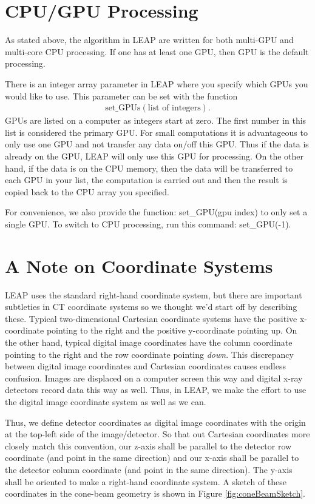 \documentclass[11pt]{article}
\begin{document}
\section{CPU/GPU Processing}

As stated above, the algorithm in LEAP are written for both multi-GPU and multi-core CPU processing.  If one has at least one GPU, then GPU is the default processing.

There is an integer array parameter in LEAP where you specify which GPUs you would like to use.  This parameter can be set with the function
\begin{eqnarray*}
    \text{set\_GPUs}(\text{list of integers}).
\end{eqnarray*}
GPUs are listed on a computer as integers start at zero.  The first number in this list is considered the primary GPU.  For small computations it is advantageous to only use one GPU and not transfer any data on/off this GPU.  Thus if the data is already on the GPU, LEAP will only use this GPU for processing.  On the other hand, if the data is on the CPU memory, then the data will be transferred to each GPU in your list, the computation is carried out and then the result is copied back to the CPU array you specified.

For convenience, we also provide the function: set\_GPU(gpu index) to only set a single GPU.  To switch to CPU processing, run this command: set\_GPU(-1).

\section{A Note on Coordinate Systems}

LEAP uses the standard right-hand coordinate system, but there are important subtleties in CT coordinate systems so we thought we'd start off by describing these.  Typical two-dimensional Cartesian coordinate systems have the positive x-coordinate pointing to the right and the positive y-coordinate pointing up.  On the other hand, typical digital image coordinates have the column coordinate pointing to the right and the row coordinate pointing \textit{down}.  This discrepancy between digital image coordinates and Cartesian coordinates causes endless confusion.  Images are displaced on a computer screen this way and digital x-ray detectors record data this way as well.  Thus, in LEAP, we make the effort to use the digital image coordinate system as well as we can.

Thus, we define detector coordinates as digital image coordinates with the origin at the top-left side of the image/detector.  So that out Cartesian coordinates more closely match this convention, our z-axis shall be parallel to the detector row coordinate (and point in the same direction) and our x-axis shall be parallel to the detector column coordinate (and point in the same direction).  The y-axis shall be oriented to make a right-hand coordinate system.  A sketch of these coordinates in the cone-beam geometry is shown in Figure \ref{fig:coneBeamSketch}.
\end{document}
